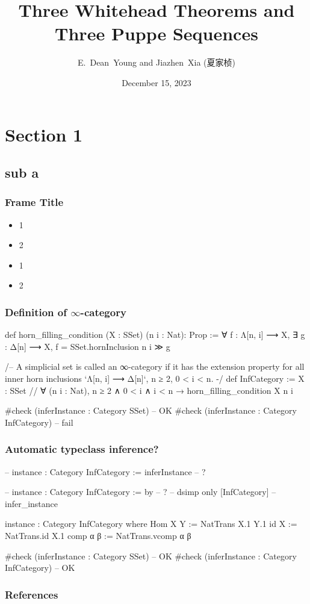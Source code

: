 \documentclass{beamer}
\title{Three Whitehead Theorems and Three Puppe Sequences}
\author{E.~Dean~Young and Jiazhen~Xia (夏家桢)}
\date{December 15, 2023}
\begin{document}
\begin{frame}
\titlepage
\end{frame}


\section{Section 1}
\subsection{sub a}

\begin{frame}
\frametitle{Frame Title}
\begin{itemize}
	\item 1
	\item 2
\end{itemize}
\medskip
\begin{itemize}
	\item 1
	\item 2
\end{itemize}
\end{frame}


\begin{frame}[fragile] %
\frametitle{Definition of $\infty$-category}
  \begin{leancode}
  def horn_filling_condition (X : SSet) (n i : Nat): Prop :=
    ∀ f : Λ[n, i] ⟶ X, ∃ g : Δ[n] ⟶ X,
    f = SSet.hornInclusion n i ≫ g
  
  /-- A simplicial set is called an ∞-category
  if it has the extension property for all inner horn inclusions
  `Λ[n, i] ⟶ Δ[n]`, n ≥ 2, 0 < i < n. -/
  def InfCategory := {X : SSet //
    ∀ (n i : Nat),
    n ≥ 2 ∧ 0 < i ∧ i < n → horn_filling_condition X n i}
    
  #check (inferInstance : Category SSet) -- OK
  #check (inferInstance : Category InfCategory) -- fail
  \end{leancode}
\end{frame}

\begin{frame}[fragile] %
\frametitle{Automatic typeclass inference?}
  \begin{leancode}
  -- instance : Category InfCategory := inferInstance -- ?
  
  -- instance : Category InfCategory := by -- ?
  --   dsimp only [InfCategory]
  --   infer_instance
  
  instance : Category InfCategory where
    Hom X Y := NatTrans X.1 Y.1
    id X := NatTrans.id X.1
    comp α β := NatTrans.vcomp α β

  #check (inferInstance : Category SSet) -- OK
  #check (inferInstance : Category InfCategory) -- OK
  \end{leancode}
\end{frame}


\begin{frame}[allowframebreaks]
	\nocite{*}
       \frametitle{References}
\end{frame}


\end{document}
